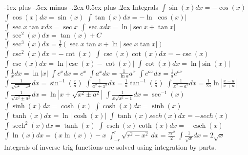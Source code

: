 \documentclass[10pt,a4paper,landscape]{article}
\makeatletter
\DeclareMathOperator{\sech}{sech}
\DeclareMathOperator{\csch}{csch}
\renewcommand{\section}{\@startsection{section}{1}{0mm}%
{-1ex plus -.5ex minus -.2ex}%
{0.5ex plus .2ex}%
{\normalfont\large\bfseries}}
\makeatother
\begin{document}
\begin{multicols*}{5}
	\section{Integrals}
	\scriptsize
	$\int \sin(x) dx = -\cos(x) $\newline
	$\int \cos(x) dx = \sin(x) $\newline
	$\int \tan(x) dx = -\ln|\cos(x)| $\newline
	$\int \sec x \tan x dx = \sec x $\newline
	$\int \sec x dx = \ln | \sec x + \tan x |$\newline 
	$\int \sec^2(x) dx = \tan(x) + C $ 
	$\int \sec^3(x) dx= \frac{1}{2}(\sec x \tan x + \ln| \sec x \tan x |)  $ 
	$\int \csc^2(x) dx= -\cot(x)$\newline
	$\int \csc (x) \cot (x) dx = - \csc(x)$\newline
	$\int \csc (x) dx = \ln | \csc (x) - \cot (x) | $\newline
	$\int \cot(x) dx = \ln|\sin(x)| $\newline
	$\int \frac{1}{x}dx = \ln|x|$\newline
	$\int e^x dx = e^x $\newline
	$\int a^x dx = \frac{1}{\ln a} a^x $\newline
	$\int e^{ax} dx = \frac{1}{a} e^{ax} $\newline
	$\int \frac{1}{\sqrt{a^2-x^2}} dx = \sin^{-1}(\frac{x}{a}) $\newline
	$\int \frac{1}{a^2+x^2} dx = \frac{1}{a} \tan^{-1}(\frac{x}{a}) $\newline
	$\int \frac{1}{x^2-a^2} dx = \frac{1}{2a} \ln |\frac{x-a}{x+a}|$\newline 
	$\int \frac{1}{\sqrt{x^2 \pm a^2}} dx=\ln |x+\sqrt{x^2 \pm a^2}|$\newline
	$\int \frac{1}{x\sqrt{x^2-1}} dx = \sec^{-1}(x) $\newline
	$\int \sinh(x) dx = \cosh(x) $\newline
	$\int \cosh(x) dx = \sinh(x) $\newline
	$\int \tanh(x) dx = \ln|\cosh(x)| $\newline
	$\int \tanh(x)sech(x) dx = -sech(x) $\newline
	$\int \sech^2(x) dx = \tanh(x) $\newline
	$\int \csch(x)\coth(x) dx = -\csch(x) $\newline
	$ \int \ln(x) dx = (x \ln(x))-x $\newline
	$ \int^r_{-r} \sqrt{ r^2 - x^2 }\ dx = \frac{ \pi r^2 }{ 2 }  $\newline
	$\int \frac{1}{\sqrt{x}} dx = 2\sqrt{x} $\newline
	Integrals of inverse trig functions are solved using integration by parts.\newline


\end{multicols*}
\end{document}
